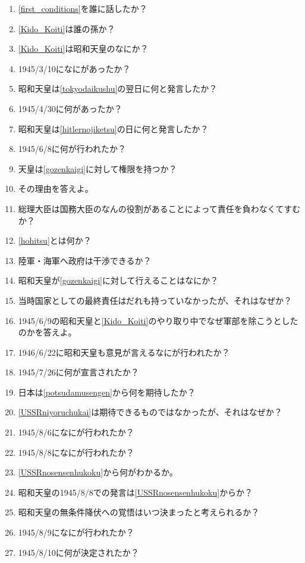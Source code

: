 \documentclass[]{jsarticle}
\begin{document}
\begin{enumerate}
	\item \ref{first_conditions}を誰に話したか？\label{Kido_Koiti}
	\item \ref{Kido_Koiti}は誰の孫か？
	\item \ref{Kido_Koiti}は昭和天皇のなにか？
	\item 1945/3/10になにがあったか？\label{tokyodaikushu}
	\item 昭和天皇は\ref{tokyodaikushu}の翌日に何と発言したか？
	\item 1945/4/30に何があったか？\label{hitlernojiketsu}
	\item 昭和天皇は\ref{hitlernojiketsu}の日に何と発言したか？
	\item 1945/6/8に何が行われたか？\label{gozenkaigi}
	\item 天皇は\ref{gozenkaigi}に対して権限を持つか？
	\item その理由を答えよ。
	\item 総理大臣は国務大臣のなんの役割があることによって責任を負わなくてすむか？\label{hohitsu}
	\item \ref{hohitsu}とは何か？
	\\
	\item 陸軍・海軍へ政府は干渉できるか？
	\item 昭和天皇が\ref{gozenkaigi}に対して行えることはなにか？
	\item 当時国家としての最終責任はだれも持っていなかったが、それはなぜか？
	\item 1945/6/9の昭和天皇と\ref{Kido_Koiti}のやり取り中でなぜ軍部を除こうとしたのかを答えよ。
	\item 1946/6/22に昭和天皇も意見が言えるなにが行われたか？
	\item 1945/7/26に何が宣言されたか？\label{potsudamusengen}
	\item 日本は\ref{potsudamusengen}から何を期待したか？\label{USSRniyoruchukai}
	\item \ref{USSRniyoruchukai}は期待できるものではなかったが、それはなぜか？
	\item 1945/8/6になにが行われたか？
	\item 1945/8/8になにが行われたか？\label{USSRnosensenhukoku}
	\item \ref{USSRnosensenhukoku}から何がわかるか。
	\item 昭和天皇の1945/8/8での発言は\ref{USSRnosensenhukoku}からか？
	\item 昭和天皇の無条件降伏への覚悟はいつ決まったと考えられるか？
	\item 1945/8/9になにが行われたか？
	\item 1945/8/10に何が決定されたか？

\end{enumerate}
\end{document}
